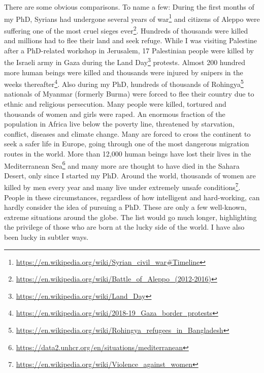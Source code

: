 There are some obvious comparisons. To name a few: During the first months of my PhD, Syrians had undergone several years of war\footnote{\href{https://en.wikipedia.org/wiki/Syrian_civil_war\#Timeline}{https://en.wikipedia.org/wiki/Syrian\_civil\_war\#Timeline}} and citizens of Aleppo were suffering one of the most cruel sieges ever\footnote{\href{https://en.wikipedia.org/wiki/Battle_of_Aleppo_(2012-2016)}{https://en.wikipedia.org/wiki/Battle\_of\_Aleppo\_(2012-2016)}}. Hundreds of thousands were killed and millions had to flee their land and seek refuge. While I was visiting Palestine after a PhD-related workshop in Jerusalem, 17 Palestinian people were killed by the Israeli army in Gaza during the Land Day\footnote{\href{https://en.wikipedia.org/wiki/Land_Day}{https://en.wikipedia.org/wiki/Land\_Day}} protests. Almost 200 hundred more human beings were killed and thousands were injured by snipers in the weeks thereafter\footnote{\href{https://en.wikipedia.org/wiki/2018-19_Gaza_border_protests}{https://en.wikipedia.org/wiki/2018-19\_Gaza\_border\_protests}}. Also during my PhD, hundreds of thousands of Rohingya\footnote{\href{https://en.wikipedia.org/wiki/Rohingya_refugees_in_Bangladesh}{https://en.wikipedia.org/wiki/Rohingya\_refugees\_in\_Bangladesh}} nationals of Myanmar (formerly Burma) were forced to flee their country due to ethnic and religious persecution. Many people were killed, tortured and thousands of women and girls were raped. An enormous fraction of the population in Africa live below the poverty line, threatened by starvation, conflict, diseases and climate change. Many are forced to cross the continent to seek a safer life in Europe, going through one of the most dangerous migration routes in the world. More than 12,000 human beings have lost their lives in the Mediterranean Sea\footnote{\href{https://data2.unhcr.org/en/situations/mediterranean}{https://data2.unhcr.org/en/situations/mediterranean}} and many more are thought to have died in the Sahara Desert, only since I started my PhD. Around the world, thousands of women are killed by men every year and many live under extremely unsafe conditions\footnote{\href{https://en.wikipedia.org/wiki/Violence_against_women}{https://en.wikipedia.org/wiki/Violence\_against\_women}}. People in these circumstances, regardless of how intelligent and hard-working, can hardly consider the idea of pursuing a PhD. These are only a few well-known, extreme situations around the globe. The list would go much longer, highlighting the privilege of those who are born at the lucky side of the world. I have also been lucky in subtler ways.

